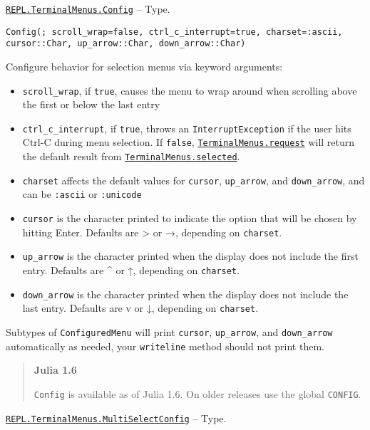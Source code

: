 \hypertarget{9206975326561845627}{}
\hyperlink{9206975326561845627}{\texttt{REPL.TerminalMenus.Config}}  -- {Type.}

\begin{adjustwidth}{2em}{0pt}


\begin{verbatim}
Config(; scroll_wrap=false, ctrl_c_interrupt=true, charset=:ascii, cursor::Char, up_arrow::Char, down_arrow::Char)
\end{verbatim}

Configure behavior for selection menus via keyword arguments:

\begin{itemize}
\item \texttt{scroll\_wrap}, if \texttt{true}, causes the menu to wrap around when scrolling above the first or below the last entry


\item \texttt{ctrl\_c\_interrupt}, if \texttt{true}, throws an \texttt{InterruptException} if the user hits Ctrl-C during menu selection. If \texttt{false}, \hyperlink{6305836527176008123}{\texttt{TerminalMenus.request}} will return the default result from \hyperlink{1632874714880957610}{\texttt{TerminalMenus.selected}}.


\item \texttt{charset} affects the default values for \texttt{cursor}, \texttt{up\_arrow}, and \texttt{down\_arrow}, and can be \texttt{:ascii} or \texttt{:unicode}


\item \texttt{cursor} is the character printed to indicate the option that will be chosen by hitting {\textquotedbl}Enter.{\textquotedbl} Defaults are {\textquotesingle}>{\textquotesingle} or {\textquotesingle}→{\textquotesingle}, depending on \texttt{charset}.


\item \texttt{up\_arrow} is the character printed when the display does not include the first entry. Defaults are {\textquotesingle}{\textasciicircum}{\textquotesingle} or {\textquotesingle}↑{\textquotesingle}, depending on \texttt{charset}.


\item \texttt{down\_arrow} is the character printed when the display does not include the last entry. Defaults are {\textquotesingle}v{\textquotesingle} or {\textquotesingle}↓{\textquotesingle}, depending on \texttt{charset}.

\end{itemize}
Subtypes of \texttt{ConfiguredMenu} will print \texttt{cursor}, \texttt{up\_arrow}, and \texttt{down\_arrow} automatically as needed, your \texttt{writeline} method should not print them.

\begin{quote}
\textbf{Julia 1.6}

\texttt{Config} is available as of Julia 1.6. On older releases use the global \texttt{CONFIG}.

\end{quote}


\end{adjustwidth}
\hypertarget{1206320185875401685}{}
\hyperlink{1206320185875401685}{\texttt{REPL.TerminalMenus.MultiSelectConfig}}  -- {Type.}

